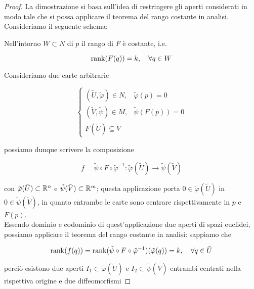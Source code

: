 \begin{proof}
	La dimostrazione si basa sull'idea di restringere gli aperti considerati in modo tale che si possa applicare il teorema del rango costante in analisi. \\
	Consideriamo il seguente schema:
	

	Nell'intorno $ W \subset N $ di $ p $ il rango di $ F $ è costante, i.e.
	
	\begin{equation}
		\rank(F(q)) = k \qcomma \forall q \in W
	\end{equation}

	Consideriamo due carte arbitrarie
	
	\begin{equation}
		\begin{cases}
			(\tilde{U},\tilde{\varphi}) \in N, & \tilde{\varphi}(p) = 0 \\
			(\tilde{V},\tilde{\psi}) \in M, & \tilde{\psi}(F(p)) = 0 \\
			F(\tilde{U}) \subseteq \tilde{V}
		\end{cases}
	\end{equation}

	 possiamo dunque scrivere la composizione
	
	\begin{equation}
		f = \tilde{\psi} \circ F \circ \tilde{\varphi}^{-1} : \tilde{\varphi}(\tilde{U}) \to \tilde{\psi}(\tilde{V})
	\end{equation}

	con $ \tilde{\varphi}(\tilde{U}) \subset \mathbb{R}^{n} $ e $ \tilde{\psi}(\tilde{V}) \subset \mathbb{R}^{m} $; questa applicazione porta $ 0 \in \tilde{\varphi}(\tilde{U}) $ in $ 0 \in \tilde{\psi}(\tilde{V}) $, in quanto entrambe le carte sono centrare rispettivamente in $ p $ e $ F(p) $. \\
	Essendo dominio e codominio di quest'applicazione due aperti di spazi euclidei, possiamo applicare il teorema del rango costante in analisi: sappiamo che
	
	\begin{equation}
		\rank(f(q)) = \rank(\tilde{\psi} \circ F \circ \tilde{\varphi}^{-1})(\tilde{\varphi}(q)) = k \qcomma \forall q \in \tilde{U}
	\end{equation}

	perciò esistono due aperti $ I_{1} \subset \tilde{\varphi}(\tilde{U}) $ e $ I_{2} \subset \tilde{\psi}(\tilde{V}) $ entrambi centrati nella rispettiva origine e due diffeomorfismi
	

\end{proof}
